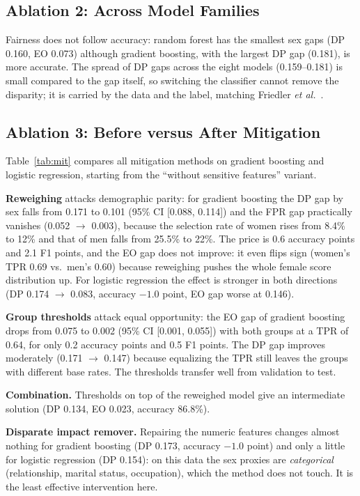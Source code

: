 \documentclass[conference]{IEEEtran}
\begin{document}
\subsection{Ablation 2: Across Model Families}
Fairness does not follow accuracy: random forest has the smallest sex gaps (DP 0.160, EO 0.073) although gradient boosting, with the largest DP gap (0.181), is more accurate. The spread of DP gaps across the eight models (0.159--0.181) is small compared to the gap itself, so switching the classifier cannot remove the disparity; it is carried by the data and the label, matching Friedler \textit{et al.}~\cite{friedler2019}.

\subsection{Ablation 3: Before versus After Mitigation}\label{sec:mit}
Table~\ref{tab:mit} compares all mitigation methods on gradient boosting and logistic regression, starting from the ``without sensitive features'' variant.

\textbf{Reweighing} attacks demographic parity: for gradient boosting the DP gap by sex falls from 0.171 to 0.101 (95\% CI [0.088, 0.114]) and the FPR gap practically vanishes (0.052 $\rightarrow$ 0.003), because the selection rate of women rises from 8.4\% to 12\% and that of men falls from 25.5\% to 22\%. The price is 0.6 accuracy points and 2.1 F1 points, and the EO gap does not improve: it even flips sign (women's TPR 0.69 vs.\ men's 0.60) because reweighing pushes the whole female score distribution up. For logistic regression the effect is stronger in both directions (DP 0.174 $\rightarrow$ 0.083, accuracy $-1.0$ point, EO gap worse at 0.146).

\textbf{Group thresholds} attack equal opportunity: the EO gap of gradient boosting drops from 0.075 to 0.002 (95\% CI [0.001, 0.055]) with both groups at a TPR of 0.64, for only 0.2 accuracy points and 0.5 F1 points. The DP gap improves moderately (0.171 $\rightarrow$ 0.147) because equalizing the TPR still leaves the groups with different base rates. The thresholds transfer well from validation to test.

\textbf{Combination.} Thresholds on top of the reweighed model give an intermediate solution (DP 0.134, EO 0.023, accuracy 86.8\%).

\textbf{Disparate impact remover.} Repairing the numeric features changes almost nothing for gradient boosting (DP 0.173, accuracy $-1.0$ point) and only a little for logistic regression (DP 0.154): on this data the sex proxies are \emph{categorical} (relationship, marital status, occupation), which the method does not touch. It is the least effective intervention here.
\end{document}
